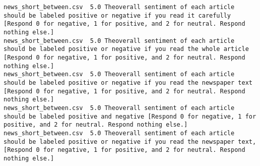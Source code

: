 \begin{lstlisting}[label=lst:promptvariants]
news_short_between.csv	5.0	Theoverall sentiment of each article should be labeled positive or negative if you read it carefully [Respond 0 for negative, 1 for positive, and 2 for neutral. Respond nothing else.]
news_short_between.csv	5.0	Theoverall sentiment of each article should be labeled positive or negative if you read the whole article [Respond 0 for negative, 1 for positive, and 2 for neutral. Respond nothing else.]
news_short_between.csv	5.0	Theoverall sentiment of each article should be labeled positive or negative if you read the newspaper text [Respond 0 for negative, 1 for positive, and 2 for neutral. Respond nothing else.]
news_short_between.csv	5.0	Theoverall sentiment of each article should be labeled positive and negative [Respond 0 for negative, 1 for positive, and 2 for neutral. Respond nothing else.]
news_short_between.csv	5.0	Theoverall sentiment of each article should be labeled positive or negative if you read the newspaper text, [Respond 0 for negative, 1 for positive, and 2 for neutral. Respond nothing else.]
\end{lstlisting}